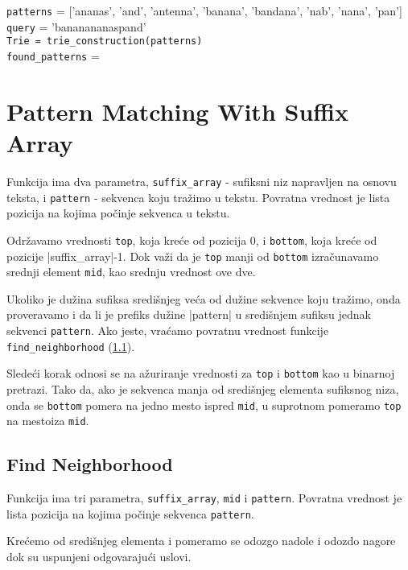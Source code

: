 \noindent\texttt{patterns} = ['ananas', 'and', 'antenna', 'banana', 'bandana', 'nab', 'nana', 'pan']
\\\texttt{query} = 'bananananaspand'
\\\texttt{Trie = trie\_construction(patterns)} 
\\\texttt{found\_patterns} =



\section{Pattern Matching With Suffix Array}

Funkcija ima dva parametra, \texttt{suffix\_array} - sufiksni niz napravljen na osnovu teksta, i \texttt{pattern} - sekvenca koju tražimo u tekstu. Povratna vrednost je lista pozicija na kojima počinje sekvenca u tekstu.

Održavamo vrednosti \texttt{top}, koja kreće od pozicija 0, i \texttt{bottom}, koja kreće od pozicije |suffix\_array|-1. Dok važi da je \texttt{top} manji od \texttt{bottom} izračunavamo srednji element \texttt{mid}, kao srednju vrednost ove dve. 

Ukoliko je dužina sufiksa središnjeg veća od dužine sekvence koju tražimo, onda proveravamo i da li je prefiks dužine |pattern| u središnjem sufiksu jednak sekvenci \texttt{pattern}. Ako jeste, vraćamo povratnu vrednost funkcije \texttt{find\_neighborhood} (\ref{findNeighborhood}). 

Sledeći korak odnosi se na ažuriranje vrednosti za \texttt{top} i \texttt{bottom} kao u binarnoj pretrazi. Tako da, ako je sekvenca manja od središnjeg elementa sufiksnog niza, onda se \texttt{bottom} pomera na jedno mesto ispred \texttt{mid}, u suprotnom pomeramo \texttt{top} na mestoiza \texttt{mid}.




\subsection{Find Neighborhood}
\label{findNeighborhood}


Funkcija ima tri parametra, \texttt{suffix\_array}, \texttt{mid} i \texttt{pattern}. Povratna vrednost je lista pozicija na kojima počinje sekvenca \texttt{pattern}.

Krećemo od središnjeg elementa i pomeramo se odozgo nadole i odozdo nagore dok su uspunjeni odgovarajući uslovi. 

